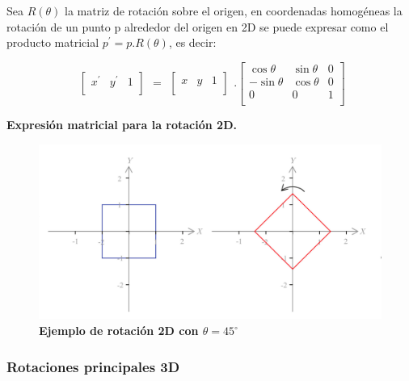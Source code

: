 Sea $R(\theta)$ la matriz de rotación sobre el origen, en coordenadas homogéneas la
rotación de un punto p alrededor del origen en 2D se puede expresar como el producto matricial $p^{\prime} = p.R(\theta)$, es decir:

\begin{equation}
\begin{array}{rccl}
\left[
\begin{array}{rccl}
{x}^{\prime} & {y}^{\prime} & 1\\
\end{array}
\right]
\end{array}
=
\begin{array}{rccl}
\left[
\begin{array}{rccl}
x & y &  1\\
\end{array}
\right]
\end{array} 
.
\left[
\begin{array}{rccl}
\cos\theta & \sin\theta & 0\\
-\sin\theta & \cos\theta & 0\\
0 & 0 & 1\\
\end{array}
\right]
\end{equation}

\begin{center}
\textbf{\footnotesize{Expresión matricial para la rotación 2D.}}
\end{center}


\begin{figure}[h]
\includegraphics[width=12cm]{Img/GEO/geo-rot2d45.jpg}
\centering
    \caption{\footnotesize{\textbf{Ejemplo de rotación 2D con $\theta = 45^{\circ}$}}}
\end{figure}


\clearpage
\subsubsection{Rotaciones principales 3D}

